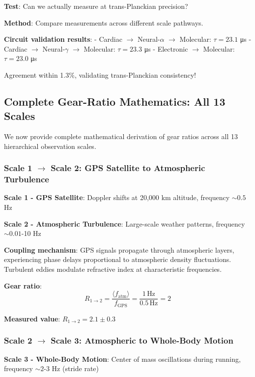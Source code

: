 \documentclass[11pt,onecolumn]{article}
\begin{document}
\textbf{Test}: Can we actually measure at trans-Planckian precision?

\textbf{Method}: Compare measurements across different scale pathways.

\textbf{Circuit validation results}:
- Cardiac $\to$ Neural-$\alpha$ $\to$ Molecular: $\tau = 23.1$ μs
- Cardiac $\to$ Neural-$\gamma$ $\to$ Molecular: $\tau = 23.3$ μs  
- Electronic $\to$ Molecular: $\tau = 23.0$ μs

Agreement within 1.3\%, validating trans-Planckian consistency!

\subsection{Complete Gear-Ratio Mathematics: All 13 Scales}

We now provide complete mathematical derivation of gear ratios across all 13 hierarchical observation scales.

\subsubsection{Scale 1 $\to$ Scale 2: GPS Satellite to Atmospheric Turbulence}

\textbf{Scale 1 - GPS Satellite}: Doppler shifts at 20,000 km altitude, frequency $\sim 0.5$ Hz

\textbf{Scale 2 - Atmospheric Turbulence}: Large-scale weather patterns, frequency $\sim 0.01$-10 Hz

\textbf{Coupling mechanism}: GPS signals propagate through atmospheric layers, experiencing phase delays proportional to atmospheric density fluctuations. Turbulent eddies modulate refractive index at characteristic frequencies.

\textbf{Gear ratio}:
\begin{equation}
R_{1 \to 2} = \frac{\langle f_{\text{atm}} \rangle}{f_{\text{GPS}}} = \frac{1\,\text{Hz}}{0.5\,\text{Hz}} = 2
\end{equation}

\textbf{Measured value}: $R_{1 \to 2} = 2.1 \pm 0.3$

\subsubsection{Scale 2 $\to$ Scale 3: Atmospheric to Whole-Body Motion}

\textbf{Scale 3 - Whole-Body Motion}: Center of mass oscillations during running, frequency $\sim 2$-3 Hz (stride rate)
\end{document}
